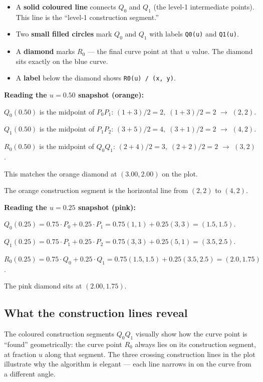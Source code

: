 \documentclass[12pt, a4paper]{article}
\newcommand{\cd}[1]{\texttt{#1}}
\begin{document}
\begin{itemize}
  \item A \textbf{solid coloured line} connects $Q_0$ and $Q_1$
        (the level-1 intermediate points).
        This line is the ``level-1 construction segment.''
  \item Two \textbf{small filled circles} mark $Q_0$ and $Q_1$
        with labels \cd{Q0(u)} and \cd{Q1(u)}.
  \item A \textbf{diamond} marks $R_0$ --- the final curve point
        at that $u$ value. The diamond sits exactly on the blue curve.
  \item A \textbf{label} below the diamond shows
        \cd{R0(u) / (x, y)}.
\end{itemize}

\begin{examplebox}
\textbf{Reading the $u = 0.50$ snapshot (orange):}

$Q_0(0.50)$ is the midpoint of $P_0P_1$:
$(1+3)/2 = 2,\; (1+3)/2 = 2$ $\to$ $(2, 2)$.

$Q_1(0.50)$ is the midpoint of $P_1P_2$:
$(3+5)/2 = 4,\; (3+1)/2 = 2$ $\to$ $(4, 2)$.

$R_0(0.50)$ is the midpoint of $Q_0Q_1$:
$(2+4)/2 = 3,\; (2+2)/2 = 2$ $\to$ $(3, 2)$.

This matches the orange diamond at $(3.00, 2.00)$
on the plot. \checkmark

The orange construction segment is the horizontal line
from $(2, 2)$ to $(4, 2)$.
\end{examplebox}

\begin{examplebox}
\textbf{Reading the $u = 0.25$ snapshot (pink):}

$Q_0(0.25) = 0.75 \cdot P_0 + 0.25 \cdot P_1
= 0.75(1,1) + 0.25(3,3) = (1.5, 1.5)$.

$Q_1(0.25) = 0.75 \cdot P_1 + 0.25 \cdot P_2
= 0.75(3,3) + 0.25(5,1) = (3.5, 2.5)$.

$R_0(0.25) = 0.75 \cdot Q_0 + 0.25 \cdot Q_1
= 0.75(1.5, 1.5) + 0.25(3.5, 2.5) = (2.0, 1.75)$.

The pink diamond sits at $(2.00, 1.75)$. \checkmark
\end{examplebox}

\subsection{What the construction lines reveal}

The coloured construction segments $Q_0Q_1$ visually show
how the curve point is ``found'' geometrically:
the curve point $R_0$ always lies on its construction
segment, at fraction $u$ along that segment.
The three crossing construction lines in the plot illustrate
why the algorithm is elegant --- each line narrows in on
the curve from a different angle.
\end{document}
